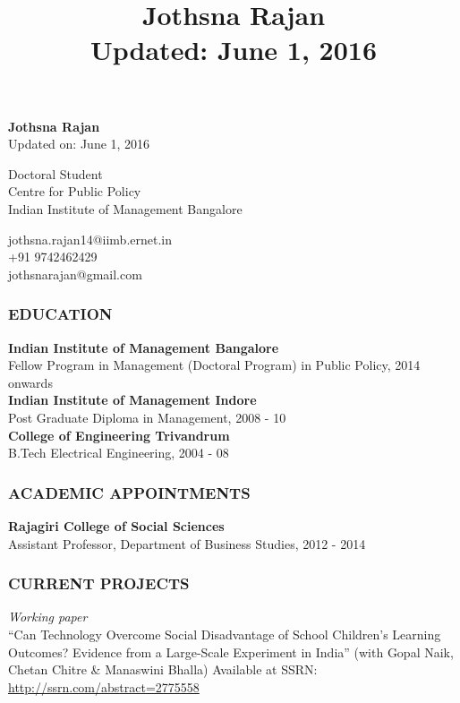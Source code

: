 \documentclass[12pt, a4paper]{article}
\title{\textbf{Jothsna Rajan \\ \small{Updated: June 1, 2016} }}
\date{}
\begin{document}
	\begin{center}
		\large{\textbf{Jothsna Rajan}} \\
		\small{Updated on: June 1, 2016}
	\end{center}
	\begin{multicols}{2}
		\begin{flushleft}
			\noindent Doctoral Student \\
			Centre for Public Policy \\
			Indian Institute of Management Bangalore \\
		\end{flushleft}
		\begin{flushright}
			\noindent jothsna.rajan14@iimb.ernet.in \\
			+91 9742462429 \\
			jothsnarajan@gmail.com \\
		\end{flushright}
	\end{multicols}
	\subsubsection*{EDUCATION}
	
	\noindent\textbf{Indian Institute of Management Bangalore} \\
	Fellow Program in Management (Doctoral Program) in Public Policy, 2014 onwards \\
	
	\noindent\textbf{Indian Institute of Management Indore} \\
	Post Graduate Diploma in Management, 2008 - 10 \\
	
	\noindent\textbf{College of Engineering Trivandrum} \\
	B.Tech Electrical Engineering, 2004 - 08
	
	\subsubsection*{ACADEMIC APPOINTMENTS}
		\noindent\textbf{Rajagiri College of Social Sciences} \\
		Assistant Professor, Department of Business Studies, 2012 - 2014 \\
	\subsubsection*{CURRENT PROJECTS}
		\noindent \textit{Working paper} \\
		``Can Technology Overcome Social Disadvantage of School Children's Learning Outcomes? Evidence from a Large-Scale Experiment in India'' (with Gopal Naik, Chetan Chitre \& Manaswini Bhalla) Available at SSRN: \url{http://ssrn.com/abstract=2775558} 
\end{document}
